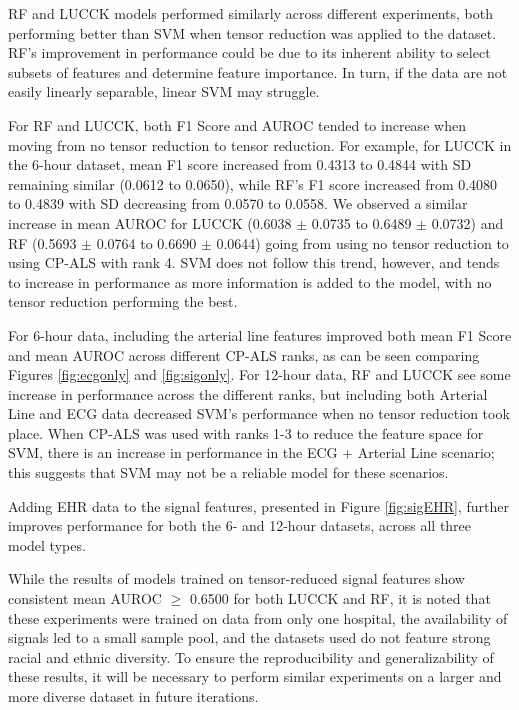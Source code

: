 
RF and LUCCK models performed similarly across different experiments, both performing better than SVM when tensor reduction was applied to the dataset. RF's improvement in performance could be due to its inherent ability to select subsets of features and determine feature importance. In turn, if the data are not easily linearly separable, linear SVM may struggle.

For RF and LUCCK, both F1 Score and AUROC tended to increase when moving from no tensor reduction to tensor reduction. For example, for LUCCK in the 6-hour dataset, mean F1 score increased from 0.4313 to 0.4844 with SD remaining similar (0.0612 to 0.0650), while RF's F1 score increased from 0.4080 to 0.4839 with SD decreasing from 0.0570 to 0.0558. We observed a similar increase in mean AUROC for LUCCK (0.6038 $\pm$ 0.0735 to 0.6489 $\pm$ 0.0732) and RF (0.5693 $\pm$ 0.0764 to 0.6690 $\pm$ 0.0644) going from using no tensor reduction to using CP-ALS with rank 4. SVM does not follow this trend, however, and tends to increase in performance as more information is added to the model, with no tensor reduction performing the best.

For 6-hour data, including the arterial line features improved both mean F1 Score and mean AUROC across different CP-ALS ranks, as can be seen comparing Figures \ref{fig:ecgonly} and \ref{fig:sigonly}. For 12-hour data, RF and LUCCK see some increase in performance across the different ranks, but including both Arterial Line and ECG data decreased SVM's performance when no tensor reduction took place. When CP-ALS was used with ranks 1-3 to reduce the feature space for SVM, there is an increase in performance in the ECG + Arterial Line scenario; this suggests that SVM may not be a reliable model for these scenarios.

Adding EHR data to the signal features, presented in Figure \ref{fig:sigEHR}, further improves performance for both the 6- and 12-hour datasets, across all three model types.

While the results of models trained on tensor-reduced signal features show consistent mean AUROC $\geq$ 0.6500 for both LUCCK and RF, it is noted that these experiments were trained on data from only one hospital, the availability of signals led to a small sample pool, and the datasets used do not feature strong racial and ethnic diversity. To ensure the reproducibility and generalizability of these results, it will be necessary to perform similar experiments on a larger and more diverse dataset in future iterations.


